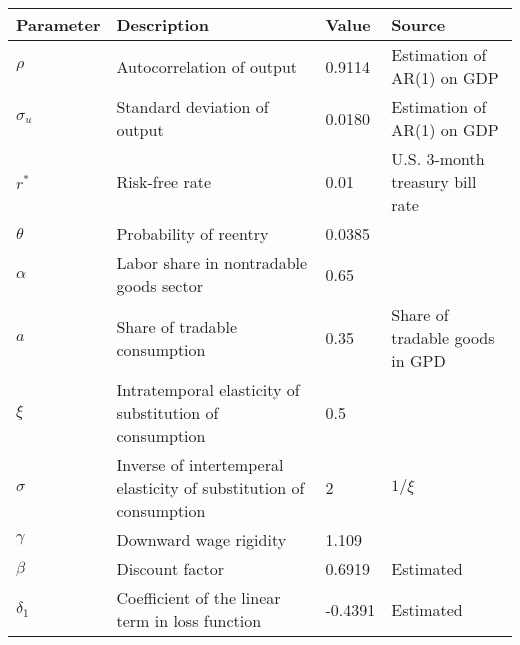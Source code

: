 \begin{table}[h]
    \centering
    \begin{tabular}{@{}llll@{}}
        \toprule
    Parameter  & Description                                                       & Value  & Source                                                                         \\ \midrule
    $\rho$     & Autocorrelation of output                                         & 0.9114  & Estimation of AR(1) on GDP\\
    $\sigma_u$ & Standard deviation of output                                      & 0.0180 & Estimation of AR(1) on GDP \\
    $r^*$      & Risk-free rate                                                    & 0.01 & U.S. 3-month treasury bill rate \\
    $\theta$   & Probability of reentry                                            & 0.0385 & \citet*{Chatterjee-12}                                              \\
    $\alpha$   & Labor share in nontradable goods sector                          & 0.65   & \citet{Jegajeevan-Sri-Lanka-DSGE}                                                       \\
    $a$        & Share of tradable consumption                                     & 0.35   & Share of tradable goods in GPD                  \\
    $\xi$      & Intratemporal elasticity of substitution of consumption & 0.5   & \citet{Na-18}                             \\
    $\sigma$   & Inverse of intertemperal elasticity of substitution of consumption  & 2   & $1 / \xi$                                                                      \\
    $\gamma$   & Downward wage rigidity                                            & 1.109   & \citet*{wage-rigidity-data}                  \\
    $\beta$    & Discount factor                                                   & 0.6919  &  Estimated                                                                              \\
    $\delta_1$ & Coefficient of the linear term in loss function                   &  -0.4391 &   Estimated                                                                             \\

\end{tabular}
\end{table}
